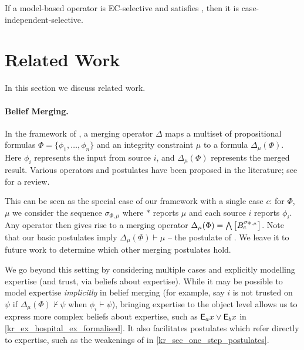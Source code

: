 \begin{corollary}
    \label{kr_cor_ec_selective_ci}
    If a model-based operator is EC-selective and satisfies \soundness{}, then
    it is case-independent-selective.
\end{corollary}

\section{Related Work}
\label{kr_sec_relatedwork}

In this section we discuss related work.

\paragraph{Belief Merging.}

In the framework of \textcite{konieczny2002merging}, a merging operator $\Delta$
maps a multiset of propositional formulas $\Phi = \{\phi_1,\ldots,\phi_n\}$ and
an integrity constraint $\mu$ to a formula $\Delta_\mu(\Phi)$. Here $\phi_i$
represents the input from source $i$, and $\Delta_\mu(\Phi)$ represents the
merged result. Various operators and postulates have been proposed in the
literature; see \cite{Konieczny_2011} for a review.

This can be seen as the special case of our framework with a single case $c$:
for $\Phi$, $\mu$ we consider the sequence $\sigma_{\Phi, \mu}$ where $\ast$
reports $\mu$ and each source $i$ reports $\phi_i$. Any operator then gives
rise to a merging operator $\Delta_\mu(\Phi) =
\bigwedge\left[{B^{\sigma_{\Phi,\mu}}_c}\right]$. Note that our basic postulates
imply $\Delta_\mu(\Phi) \vdash \mu$ -- the  postulate of
\textcite{konieczny2002merging}. We leave it to future work to determine which
other merging postulates hold.

We go beyond this setting by considering multiple cases and explicitly
modelling expertise (and trust, via beliefs about expertise). While it may be
possible to model expertise \emph{implicitly} in belief merging (for example,
say $i$ is not trusted on $\psi$ if $\Delta_\mu(\Phi) \not\vdash \psi$ when
$\phi_i \vdash \psi$), bringing expertise to the object level allows us to
express more complex beliefs about expertise, such as $\mathsf{E}_a{x} \lor \mathsf{E}_b{x}$ in
\cref{kr_ex_hospital_ex_formalised}. It also facilitates postulates which refer
directly to expertise, such as the weakenings of  in
\cref{kr_sec_one_step_postulates}.

